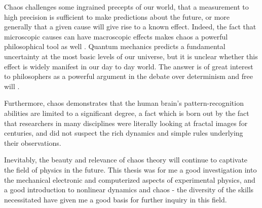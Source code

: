 \documentclass[12pt,twoside]{reedthesis}
\begin{document}
Chaos challenges some ingrained precepts of our world, that a measurement to high precision is sufficient to make predictions about the future, or more generally that a given cause will give rise to a known effect.  Indeed, the fact that microscopic causes can have macroscopic effects makes chaos a powerful philosophical tool as well \cite{orkin2000}.  Quantum mechanics predicts a fundamental uncertainty at the most basic levels of our universe, but it is unclear whether this effect is widely manifest in our day to day world\cite{griffiths2005}.  The answer is of great interest to philosophers as a powerful argument in the debate over determinism and free will \cite{bennett1999}.  

Furthermore, chaos demonstrates that the human brain's pattern-recognition abilities are limited to a significant degree, a fact which is born out by the fact that researchers in many disciplines were literally looking at fractal images for centuries, and did not suspect the rich dynamics and simple rules underlying their observations.   

Inevitably, the beauty and relevance of chaos theory will continue to captivate the field of physics in the future.  This thesis was for me a good investigation into the mechanical electronic and computerized aspects of experimental physics, and a good introduction to nonlinear dynamics and chaos - the diversity of the skills necessitated have given me a good basis for further inquiry in this field.





  \backmatter %

%  
\end{document}
